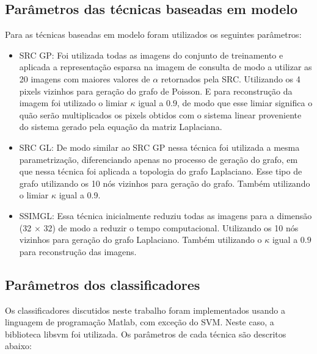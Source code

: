 \subsection{Parâmetros das técnicas baseadas em modelo}
Para as técnicas baseadas em modelo foram utilizados os seguintes parâmetros:

\begin{itemize}

\item SRC GP: Foi utilizada todas as imagens do conjunto de treinamento e aplicada a representação esparsa na imagem de consulta de modo a utilizar as 20 imagens com maiores valores de $\alpha$ retornados pela SRC.   Utilizando os 4 pixels vizinhos para geração do grafo de Poisson. E para reconstrução da imagem foi utilizado o limiar $\kappa$ igual a $0.9$, de modo que esse limiar significa o quão serão multiplicados os pixels obtidos com o sistema linear proveniente do sistema gerado pela equação da matriz Laplaciana.

\item SRC GL: De modo similar ao SRC GP nessa técnica foi utilizada a mesma parametrização, diferenciando apenas no processo de geração do grafo, em que nessa técnica foi aplicada a topologia do grafo Laplaciano. Esse tipo de grafo utilizando os 10 nós vizinhos para geração do grafo. Também utilizando o limiar $\kappa$ igual a 0.9.

\item SSIMGL: Essa técnica inicialmente reduziu todas as imagens para a dimensão (32 $\times$ 32) de modo a reduzir o tempo computacional. Utilizando os 10 nós vizinhos para geração do grafo Laplaciano. Também utilizando o $\kappa$ igual a $0.9$ para reconstrução das imagens. 

\end{itemize}

\subsection{Parâmetros dos classificadores}

Os classificadores discutidos neste trabalho foram implementados usando a linguagem de programação Matlab, com exceção do SVM. Neste caso, a biblioteca libsvm \cite{chang2011libsvm} foi utilizada. Os parâmetros de cada técnica são descritos abaixo:


